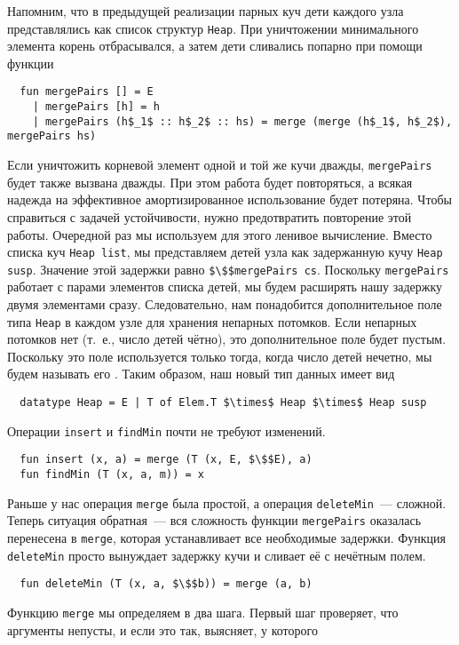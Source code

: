 Напомним, что в предыдущей реализации парных куч дети каждого узла
представлялись как список структур \lstinline!Heap!. При уничтожении
минимального элемента корень отбрасывался, а затем дети сливались
попарно при помощи функции
\begin{lstlisting}
  fun mergePairs [] = E
    | mergePairs [h] = h
    | mergePairs (h$_1$ :: h$_2$ :: hs) = merge (merge (h$_1$, h$_2$), mergePairs hs)
\end{lstlisting}
Если уничтожить корневой элемент одной и той же кучи дважды,
\lstinline!mergePairs!  будет также вызвана дважды. При этом работа
будет повторяться, а всякая надежда на эффективное амортизированное
использование будет потеряна. Чтобы справиться с задачей устойчивости,
нужно предотвратить повторение этой работы.  Очередной раз мы
используем для этого ленивое вычисление. Вместо списка куч
\lstinline!Heap list!, мы представляем детей узла как задержанную кучу
\lstinline!Heap susp!. Значение этой задержки равно
\lstinline!$\$$mergePairs cs!. Поскольку \lstinline!mergePairs!
работает с парами элементов списка детей, мы будем расширять нашу
задержку двумя элементами сразу. Следовательно, нам понадобится
дополнительное поле типа \lstinline!Heap! в каждом узле для хранения
непарных потомков. Если непарных потомков нет (т.~е., число детей
чётно), это дополнительное поле будет пустым. Поскольку это поле
используется только тогда, когда число детей нечетно, мы будем
называть его . Таким образом, наш
новый тип данных имеет вид
\begin{lstlisting}
  datatype Heap = E | T of Elem.T $\times$ Heap $\times$ Heap susp
\end{lstlisting}
Операции \lstinline!insert! и \lstinline!findMin! почти не требуют
изменений.
\begin{lstlisting}
  fun insert (x, a) = merge (T (x, E, $\$$E), a)
  fun findMin (T (x, a, m)) = x
\end{lstlisting}
Раньше у нас операция \lstinline!merge! была простой, а операция
\lstinline!deleteMin!~--- сложной. Теперь ситуация обратная~--- вся
сложность функции \lstinline!mergePairs! оказалась перенесена в
\lstinline!merge!, которая устанавливает все необходимые
задержки. Функция \lstinline!deleteMin! просто вынуждает задержку кучи
и сливает её с нечётным полем.
\begin{lstlisting}
  fun deleteMin (T (x, a, $\$$b)) = merge (a, b)
\end{lstlisting}
Функцию \lstinline!merge! мы определяем в два шага. Первый шаг
проверяет, что аргументы непусты, и если это так, выясняет, у которого
